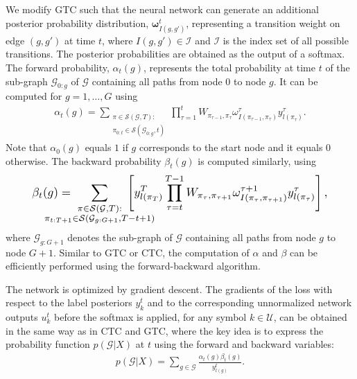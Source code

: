 \documentclass{article}
\begin{document}
We modify GTC such that the neural network can generate an additional posterior probability distribution, $\mathbf{\omega}^t_{I(g, g')}$, representing a transition weight on edge $(g, g')$ at time $t$, where $I(g, g')\in\mathcal{I}$ and $\mathcal{I}$ is the index set of all possible transitions. The posterior probabilities are obtained as the output of a softmax.
The forward probability, $\alpha_t(g)$, represents the total probability at time $t$ of the sub-graph $\mathcal{G}_{0:g}$  of $\mathcal{G}$ containing all paths from node $0$ to node $g$. It can be computed for $g=1,\dots,G$ using
\begin{align}
    \alpha_t (g) = \sum_{\substack{\pi \in \mathcal{S}(\mathcal{G},T):\\ \pi_{0:t} \in \mathcal{S}(\mathcal{G}_{0:g},t)}} \prod_{\tau=1}^t W_{\pi_{\tau-1},\pi_\tau}  \omega^{\tau}_{I(\pi_{\tau-1},\pi_\tau)}  y_{l(\pi_{\tau})}^{\tau}. \label{eq:grapctc_fw_probs_ext}
\end{align}
Note that $\alpha_0(g)$ equals $1$ if $g$ corresponds to the start node and it equals $0$ otherwise.
The backward probability $\beta_t (g)$ is computed similarly, using
\begin{align}
    \label{eq:grapctc_bw_probs_ext}
    \resizebox{.91\hsize}{!}{
        $
        \displaystyle \beta_t (g) =\!\!\!\!\!\!\!\!\!\!\!\!\!\!\! \sum_{
            \substack{\pi \in \mathcal{S}(\mathcal{G},T):\\ \pi_{t:T+1} \in \mathcal{S}(\mathcal{G}_{g:G+1},T-t+1)}
        }\!\!\!\!\!\!\!\!\!\!\!\!\!\!\! \left[ 
            y_{l(\pi_{T})}^{T} \prod_{\tau=t}^{T-1} W_{\pi_{\tau},\pi_{\tau+1}} \omega^{\tau+1}_{I(\pi_{\tau},\pi_{\tau+1})} y_{l(\pi_{\tau})}^{\tau}
        \right],
        $
    }
\end{align}
where $\mathcal{G}_{g:G+1}$ denotes the sub-graph of $\mathcal{G}$ containing all paths from node $g$ to node $G+1$. Similar to GTC or CTC, the computation of $\alpha$ and $\beta$ can be efficiently performed using the forward-backward algorithm.

The network is optimized by gradient descent. The gradients of the loss with respect to the label posteriors $y_{k}^{t}$ and to the corresponding unnormalized network outputs $u_k^t$ before the softmax is applied, for any symbol $k \in \mathcal{U}$, can be obtained in the same way as in CTC and GTC, where the key idea is to express the probability function $p(\mathcal{G}|X)$ at $t$ using the forward and backward variables:
\begin{align}
 p(\mathcal{G}|X) = \sum_{g \in \mathcal{G}} \frac{\alpha_t(g) \beta_t(g)}{y^{t}_{l(g)}}.
\label{eq:fw_bw}
\end{align}
\end{document}
